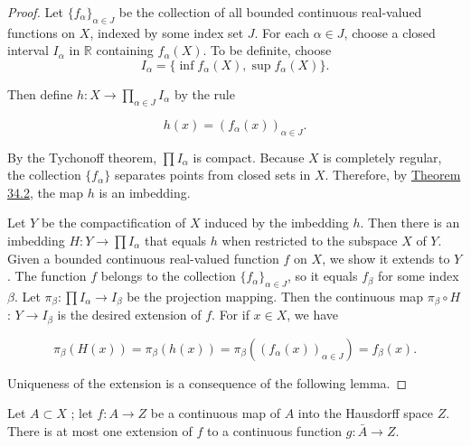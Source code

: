 \begin{proof}
 Let \({\{ f_{\alpha }\} }_{\alpha \in J}\) be the collection of all bounded continuous real-valued functions on \(X\), indexed by some index set \(J\). For each \(\alpha \in J\), choose a closed interval \(I_{\alpha }\) in \(\mathbb{R}\) containing \(f_{\alpha }(X)\). To be definite, choose
\[
I_{\alpha } = \{ {\inf {f}_{\alpha }(X),\sup {f}_{\alpha }(X) }\}.
\]

Then define \(h : X \rightarrow \mathop{\prod }\limits_{{\alpha \in J}}I_{\alpha }\) by the rule

\[
h(x) = {( f_{\alpha }(x) ) }_{\alpha \in J}.
\]

By the Tychonoff theorem, \(\prod {I}_{\alpha }\) is compact. Because \(X\) is completely regular, the collection \(\{ f_{\alpha }\}\) separates points from closed sets in \(X\). Therefore, by \hyperref[thm:34.2]{Theorem 34.2}, the map \(h\) is an imbedding.

Let \(Y\) be the compactification of \(X\) induced by the imbedding \(h\). Then there is an imbedding \(H : Y \rightarrow \prod {I}_{\alpha }\) that equals \(h\) when restricted to the subspace \(X\) of \(Y\). Given a bounded continuous real-valued function \(f\) on \(X\), we show it extends to \(Y\). The function \(f\) belongs to the collection \({\{ f_{\alpha }\} }_{\alpha \in J}\), so it equals \(f_{\beta }\) for some index \(\beta\). Let \({\pi }_{\beta } : \prod {I}_{\alpha } \rightarrow {I}_{\beta }\) be the projection mapping. Then the continuous map \({\pi }_{\beta } \circ H\) : \(Y \rightarrow {I}_{\beta }\) is the desired extension of \(f\). For if \(x \in X\), we have

\[
{\pi }_{\beta }( {H(x) }) = {\pi }_{\beta }( {h(x) }) = {\pi }_{\beta }( {( f_{\alpha }(x) ) }_{\alpha \in J}) = f_{\beta }(x).
\]

Uniqueness of the extension is a consequence of the following lemma.
\end{proof}
\begin{lemma}
\label{lem:\thetheorem}
 Let \(A \subset X\) ; let \(f : A \rightarrow Z\) be a continuous map of \(A\) into the Hausdorff space \(Z\). There is at most one extension of \(f\) to a continuous function \(g : \bar{A} \rightarrow Z\).
\end{lemma}

